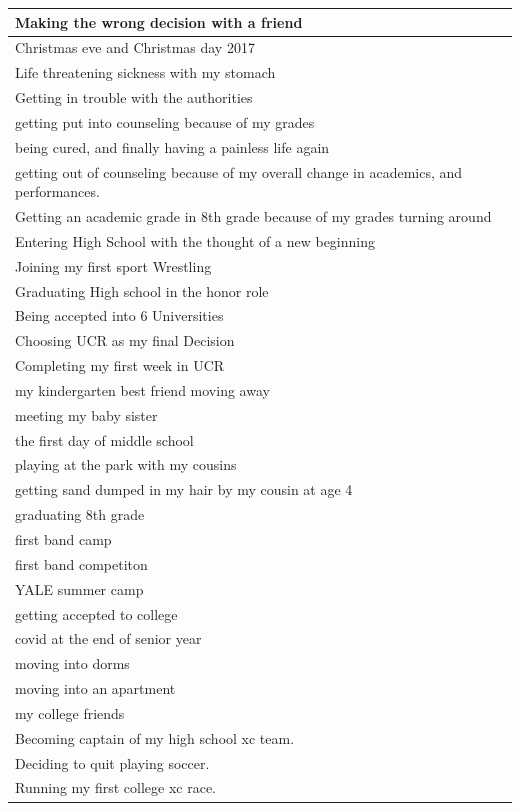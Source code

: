 \documentclass[
  .7em,
  letterpaper,
  DIV=11,
  numbers=noendperiod]{scrartcl}
\begin{document}
\begin{table}
\begin{tabular}{l}
\hline
Making the wrong decision with a friend\\
\hline
Christmas eve and Christmas day 2017\\
\hline
Life threatening sickness with my stomach\\
\hline
Getting in trouble with the authorities\\
\hline
getting put into counseling because of my grades\\
\hline
being cured, and finally having a painless life again\\
\hline
getting out of counseling because of my overall change in academics, and performances.\\
\hline
Getting an academic grade in 8th grade because of my grades turning around\\
\hline
Entering High School with the thought of a new beginning\\
\hline
Joining  my first sport Wrestling\\
\hline
Graduating High school in the honor role\\
\hline
Being accepted into 6 Universities\\
\hline
Choosing UCR as my final Decision\\
\hline
Completing my first week in UCR\\
\hline
my kindergarten best friend moving away\\
\hline
meeting my baby sister\\
\hline
the first day of middle school\\
\hline
playing at the park with my cousins\\
\hline
getting sand dumped in my hair by my cousin at age 4\\
\hline
graduating 8th grade\\
\hline
first band camp\\
\hline
first band competiton\\
\hline
YALE summer camp\\
\hline
getting accepted to college\\
\hline
covid at the end of senior year\\
\hline
moving into dorms\\
\hline
moving into an apartment\\
\hline
my college friends\\
\hline
Becoming captain of my high school xc team.\\
\hline
Deciding to quit playing soccer.\\
\hline
Running my first college xc race.\\

\end{tabular}
\end{table}
\end{document}
